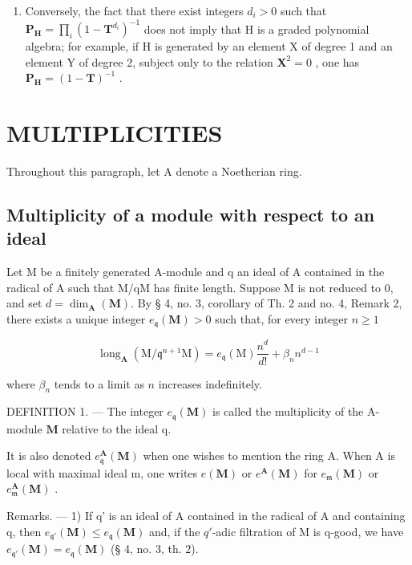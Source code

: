 \begin{enumerate}
\def\labelenumi{\arabic{enumi})}
\setcounter{enumi}{1}
\tightlist
\item
  Conversely, the fact that there exist integers \(d_{i}>0\) such that \(\mathbf{P}_{\mathbf{H}}=\prod_{i}(1-\mathbf{T}^{d_{i}})^{-1}\) does not imply that H is a graded polynomial algebra; for example, if H is generated by an element X of degree 1 and an element Y of degree 2, subject only to the relation \(\mathbf{X}^{2}=0\) , one has \(\mathbf{P}_{\mathbf{H}}=(1-\mathbf{T})^{-1}\) .
\end{enumerate}

\section{MULTIPLICITIES}

Throughout this paragraph, let A denote a Noetherian ring.

\subsection{Multiplicity of a module with respect to an ideal}

Let M be a finitely generated A-module and q an ideal of A contained in the radical of A such that M/qM has finite length. Suppose M is not reduced to 0, and set \(d = \dim_{\mathbf{A}}(\mathbf{M})\). By § 4, no. 3, corollary of Th. 2 and no. 4, Remark 2, there exists a unique integer \(e_{\mathfrak{q}}(\mathbf{M}) > 0\) such that, for every integer \(n \geqslant 1\)

\[
\operatorname{long} _ {\mathbf {A}} (\mathrm{M} / \mathfrak {q} ^ {n + 1} \mathrm{M}) = e _ {\mathfrak {q}} (\mathrm{M}) \frac {n ^ {d}}{d !} + \beta_ {n} n ^ {d - 1}
\]

where \(\beta_{n}\) tends to a limit as \(n\) increases indefinitely.

DEFINITION 1. --- The integer \(e_{\mathfrak{q}}(\mathbf{M})\) is called the multiplicity of the A-module \(\mathbf{M}\) relative to the ideal q.

It is also denoted \(e_{\mathfrak{q}}^{\mathbf{A}}(\mathbf{M})\) when one wishes to mention the ring A. When A is local with maximal ideal m, one writes \(e(\mathbf{M})\) or \(e^{\mathbf{A}}(\mathbf{M})\) for \(e_{\mathfrak{m}}(\mathbf{M})\) or \(e_{\mathfrak{m}}^{\mathbf{A}}(\mathbf{M})\) .

Remarks. --- 1) If q' is an ideal of A contained in the radical of A and containing q, then \(e_{\mathfrak{q}'}(\mathbf{M}) \leqslant e_{\mathfrak{q}}(\mathbf{M})\) and, if the \(q'\)-adic filtration of M is q-good, we have \(e_{\mathfrak{q}'}(\mathbf{M}) = e_{\mathfrak{q}}(\mathbf{M})\) (§ 4, no. 3, th. 2).

